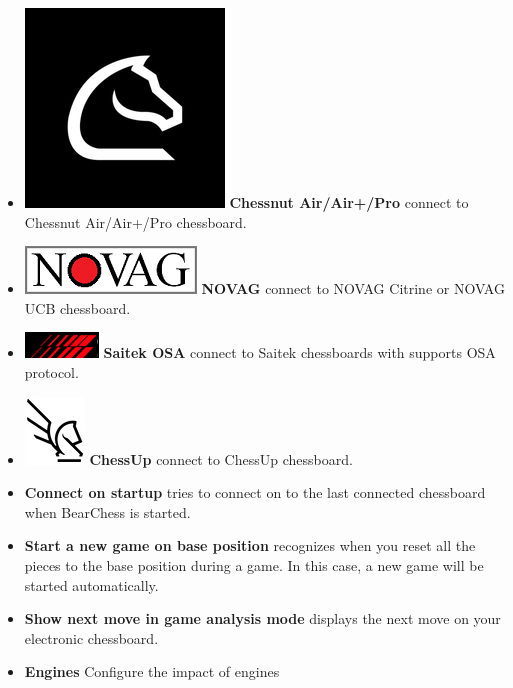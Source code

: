 \documentclass[11pt,a4paper]{article}
\begin{document}
\begin{itemize}
		\item  \includegraphics[scale=0.1]{chessnut.png} \textbf{Chessnut Air/Air+/Pro} connect to Chessnut Air/Air+/Pro chessboard.		
		\item  \includegraphics[scale=0.3]{novag48.PNG} \textbf{NOVAG} connect to NOVAG Citrine or NOVAG UCB chessboard.			
		\item  \includegraphics[scale=0.4]{Saitek_logo.PNG} \textbf{Saitek OSA} connect to Saitek chessboards with supports OSA protocol.		
		\item  \includegraphics[scale=0.4]{ChessUp.png} \textbf{ChessUp} connect to ChessUp chessboard.
		\item \textbf{Connect on startup} tries to connect on to the last connected chessboard when BearChess is started. 	
		\item \textbf{Start a new game on base position} recognizes when you reset all the pieces to the base position during a game. In this case, a new game will be started automatically.
		\item \textbf{Show next move in game analysis mode} displays the next move on your electronic chessboard.
		\item \textbf{Engines} Configure the impact of engines
		
	\end{itemize}
	
\end{document}
